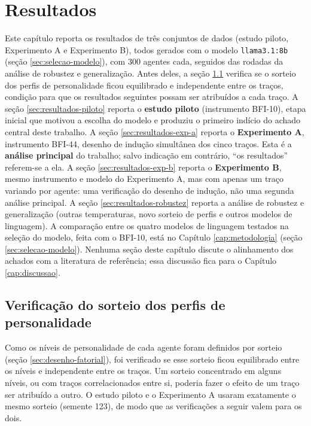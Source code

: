 \chapter{Resultados}
\label{cap:resultados}

Este capítulo reporta os resultados de três conjuntos de dados (estudo
piloto, Experimento A e Experimento B), todos gerados com o modelo
\texttt{llama3.1:8b} (seção \ref{sec:selecao-modelo}), com 300 agentes
cada, seguidos das rodadas da análise de robustez e generalização.
Antes deles, a seção \ref{sec:resultados-sorteio} verifica se o sorteio
dos perfis de personalidade ficou equilibrado e independente entre os
traços, condição para que os resultados seguintes possam ser atribuídos a
cada traço. A seção \ref{sec:resultados-piloto} reporta o \textbf{estudo piloto}
(instrumento BFI-10), etapa inicial que motivou a escolha do modelo e
produziu o primeiro indício do achado central deste trabalho. A seção
\ref{sec:resultados-exp-a} reporta o \textbf{Experimento A}, instrumento
BFI-44, desenho de indução simultânea dos cinco traços. Esta é a
\textbf{análise principal} do trabalho; salvo indicação em contrário,
``os resultados'' referem-se a ela. A seção \ref{sec:resultados-exp-b}
reporta o \textbf{Experimento B}, mesmo instrumento e modelo do
Experimento A, mas com apenas um traço variando por agente: uma
verificação do desenho de indução, não uma segunda análise principal. A
seção \ref{sec:resultados-robustez} reporta a análise de robustez e
generalização (outras temperaturas, novo sorteio de perfis e outros
modelos de linguagem). A comparação entre os quatro modelos de linguagem
testados na seleção do modelo, feita com o BFI-10, está no Capítulo
\ref{cap:metodologia} (seção \ref{sec:selecao-modelo}). Nenhuma seção deste capítulo discute o alinhamento
dos achados com a literatura de referência; essa discussão fica para o
Capítulo \ref{cap:discussao}.

\section{Verificação do sorteio dos perfis de personalidade}
\label{sec:resultados-sorteio}

Como os níveis de personalidade de cada agente foram definidos por sorteio
(seção \ref{sec:desenho-fatorial}), foi verificado se esse sorteio ficou
equilibrado entre os níveis e independente entre os traços. Um sorteio
concentrado em alguns níveis, ou com traços correlacionados entre si,
poderia fazer o efeito de um traço ser atribuído a outro. O estudo piloto e
o Experimento A usaram exatamente o mesmo sorteio (semente 123), de
modo que as verificações a seguir valem para os dois.

